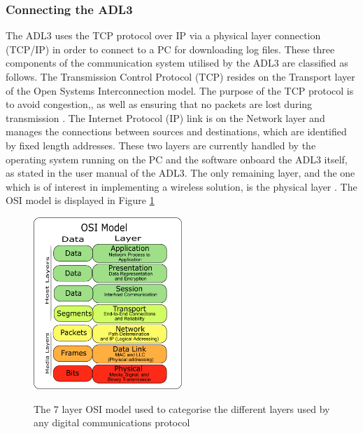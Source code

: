 \subsubsection{Connecting the ADL3}
The ADL3 uses the TCP protocol over IP via a physical layer connection (TCP/IP) in order to connect to a PC for downloading log files\cite{MAN_ADL3}. These three components of the communication system utilised by the ADL3 are classified as follows. The Transmission Control Protocol (TCP) resides on the Transport layer of the Open Systems Interconnection model\cite{zimmermann1980osi}. The purpose of the TCP protocol is to avoid congestion,\cite{allman1999tcp}, as well as ensuring that no packets are lost during transmission \cite{postel1981transmission}. The Internet Protocol (IP) link is on the Network layer\cite{zimmermann1980osi} and manages the connections between sources and destinations, which are identified by fixed length addresses\cite{postel1981internet}. These two layers are currently handled by the operating system running on the PC and the software onboard the ADL3 itself, as stated in the user manual of the ADL3\cite{MAN_ADL3}. The only remaining layer, and the one which is of interest in implementing a wireless solution, is the physical layer \cite{zimmermann1980osi}. The OSI model is displayed in Figure \ref{TEL_osi_model_7_layers.png}

\begin{figure}[h!]
  \caption{The 7 layer OSI model used to categorise the different layers used by any digital communications protocol}
  \centering
    \includegraphics[width=0.5\textwidth]{Images/Telemetry/TEL_osi_model_7_layers.png}
    \label{TEL_osi_model_7_layers.png}
\end{figure}


